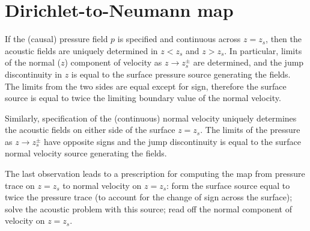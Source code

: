 


\section{Dirichlet-to-Neumann map}

If the  (causal) pressure field $p$ is specified and continuous across $z=z_s$, then the acoustic fields are uniquely determined in $z<z_s$ and $z>z_s$. In particular, limits of  the normal ($z$) component of velocity  as $z\rightarrow z_s^{\pm}$ are determined, and the jump discontinuity in $z$ is equal to the surface pressure source generating the fields. The limits from the two sides are equal except for sign, therefore the surface source is equal to twice the limiting boundary value of the normal velocity.

Similarly, specification of the (continuous) normal velocity uniquely determines the acoustic fields on either side of the surface $z=z_s$. The limits of the pressure as $z \rightarrow z_s^{\pm}$ have opposite signs and the jump discontinuity is equal to the surface normal velocity source generating the fields.

The last observation leads to a prescription for computing the map from pressure trace on $z=z_s$ to normal velocity on $z=z_s$: form the surface source equal to twice the pressure trace (to account for the change of sign across the surface); solve the acoustic problem with this source; read off the normal component of velocity on $z=z_s$.

